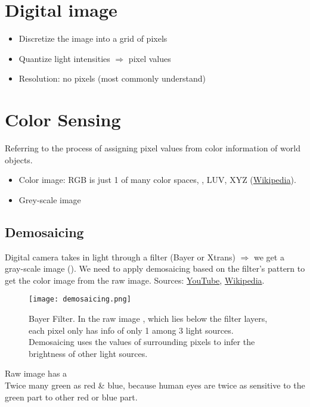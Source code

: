\section{Digital image}
\begin{itemize}
	\item Discretize the image into a grid of pixels
	\item Quantize light intensities $\Rightarrow$ pixel values
	\item Resolution: \ac{no} pixels (most commonly understand)
\end{itemize}

\section{Color Sensing}
Referring to the process of assigning pixel values from color information of world objects.
\begin{itemize}
	\item Color image: RGB is just 1 of many color spaces, \eg, LUV, XYZ (\href{https://en.wikipedia.org/wiki/List_of_color_spaces_and_their_uses}{Wikipedia}).
	\item Grey-scale image
\end{itemize}

\subsection{Demosaicing}
Digital camera takes in light through a filter (Bayer or Xtrans) $\Rightarrow$ we get a gray-scale image (). We need to apply demosaicing based on the filter's pattern to get the color image from the raw image. Sources: \href{https://www.youtube.com/watch?v=9cPxEFpg3Eg}{YouTube}, \href{https://en.wikipedia.org/wiki/Demosaicing}{Wikipedia}.
\begin{figure}[hbt!]
	\centering
	\texttt{[image: demosaicing.png]}
	\caption{\Eg Bayer Filter. In the raw image , which lies below the filter layers, each pixel only has \ac{info} of only 1 among 3 light sources. Demosaicing uses the values of surrounding pixels to infer the brightness of other light sources.}
	\label{fig:demosaicing}
\end{figure}

\note Raw image has a \\
Twice many green as red \& blue, because human eyes are twice as sensitive to the green part to other red or blue part.
